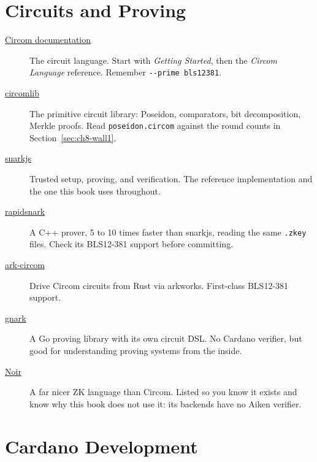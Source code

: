 \section{Circuits and Proving} \label{sec:sito-circuits}

\begin{description}
  \item[\href{https://docs.circom.io/}{Circom documentation}]
    The circuit language. Start with \emph{Getting Started}, then the
    \emph{Circom Language} reference. Remember
    \texttt{-{}-prime bls12381}.

  \item[\href{https://github.com/iden3/circomlib}{circomlib}]
    The primitive circuit library: Poseidon, comparators, bit decomposition,
    Merkle proofs. Read \texttt{poseidon.circom} against the round counts in
    Section~\ref{sec:ch8-wall1}.

  \item[\href{https://github.com/iden3/snarkjs}{snarkjs}]
    Trusted setup, proving, and verification. The reference implementation and
    the one this book uses throughout.

  \item[\href{https://github.com/iden3/rapidsnark}{rapidsnark}]
    A C++ prover, 5 to 10 times faster than snarkjs, reading the same
    \texttt{.zkey} files. Check its BLS12-381 support before committing.

  \item[\href{https://github.com/arkworks-rs/circom-compat}{ark-circom}]
    Drive Circom circuits from Rust via arkworks. First-class BLS12-381
    support.

  \item[\href{https://github.com/Consensys/gnark}{gnark}]
    A Go proving library with its own circuit DSL. No Cardano verifier, but
    good for understanding proving systems from the inside.

  \item[\href{https://noir-lang.org/}{Noir}]
    A far nicer ZK language than Circom. Listed so you know it exists and know
    why this book does not use it: its backends have no Aiken verifier.
\end{description}

\section{Cardano Development} \label{sec:sito-cardano-dev}

